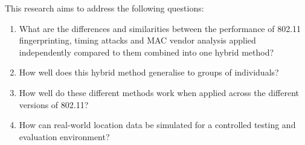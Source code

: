 This research aims to address the following questions:
\begin{enumerate}
    \itemsep-0.5em
    \item What are the differences and similarities between the performance of 802.11 fingerprinting, timing attacks and MAC vendor analysis applied independently compared to them combined into one hybrid method?
    \item How well does this hybrid method generalise to groups of individuals?
    \item How well do these different methods work when applied across the different versions of 802.11?
    \item How can real-world location data be simulated for a controlled testing and evaluation environment?
\end{enumerate}
